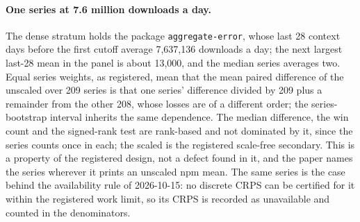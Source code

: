 \paragraph{One series at 7.6 million downloads a day.} The dense stratum holds the package
\texttt{aggregate-error}, whose last 28 context days before the first cutoff average 7,637,136 downloads a
day; the next largest last-28 mean in the panel is about 13,000, and the median series averages two.
Equal series weights, as registered, mean that the mean paired difference of the unscaled \qs{} over 209
series is that one series' difference divided by 209 plus a remainder from the other 208, whose losses are
of a different order; the series-bootstrap interval inherits the same dependence. The median difference,
the win count and the signed-rank test are rank-based and not dominated by it, since the series counts once
in each; the scaled \qs{} is the registered scale-free secondary. This is a property of the registered
design, not a defect found in it, and the paper names the series wherever it prints an unscaled npm mean.
The same series is the case behind the availability rule of 2026-10-15: no discrete CRPS can be certified
for it within the registered work limit, so its CRPS is recorded as unavailable and counted in the
denominators.
